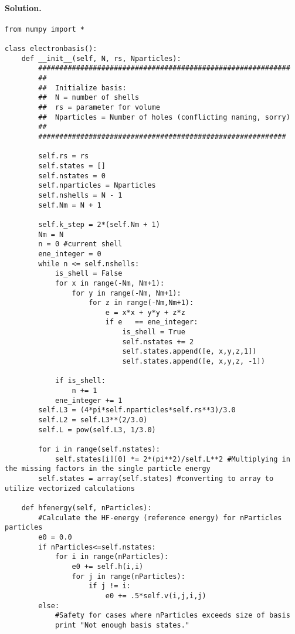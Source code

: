 \documentclass[%
oneside,                 %
final,                   %
10pt]{article}
\newenvironment{doconceexercise}{}{}
\begin{document}
\begin{doconceexercise}
\paragraph{Solution.}
\begin{verbatim}
from numpy import *

class electronbasis():
    def __init__(self, N, rs, Nparticles):
        ############################################################
        ##
        ##  Initialize basis: 
        ##  N = number of shells
        ##  rs = parameter for volume 
        ##  Nparticles = Number of holes (conflicting naming, sorry)
        ##
        ###########################################################
        
        self.rs = rs
        self.states = []
        self.nstates = 0
        self.nparticles = Nparticles
        self.nshells = N - 1
        self.Nm = N + 1
        
        self.k_step = 2*(self.Nm + 1)
        Nm = N
        n = 0 #current shell
        ene_integer = 0
        while n <= self.nshells:
            is_shell = False
            for x in range(-Nm, Nm+1):
                for y in range(-Nm, Nm+1):
                    for z in range(-Nm,Nm+1):
                        e = x*x + y*y + z*z
                        if e   == ene_integer:
                            is_shell = True
                            self.nstates += 2
                            self.states.append([e, x,y,z,1])
                            self.states.append([e, x,y,z, -1])
                            
            if is_shell:
                n += 1
            ene_integer += 1
        self.L3 = (4*pi*self.nparticles*self.rs**3)/3.0
        self.L2 = self.L3**(2/3.0)
        self.L = pow(self.L3, 1/3.0)
        
        for i in range(self.nstates):
            self.states[i][0] *= 2*(pi**2)/self.L**2 #Multiplying in the missing factors in the single particle energy
        self.states = array(self.states) #converting to array to utilize vectorized calculations    
        
    def hfenergy(self, nParticles):
        #Calculate the HF-energy (reference energy) for nParticles particles
        e0 = 0.0
        if nParticles<=self.nstates:
            for i in range(nParticles):
                e0 += self.h(i,i)
                for j in range(nParticles):
                    if j != i:
                        e0 += .5*self.v(i,j,i,j)
        else:
            #Safety for cases where nParticles exceeds size of basis
            print "Not enough basis states."
            

\end{verbatim}
\end{doconceexercise}
\end{document}
